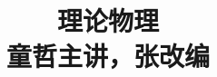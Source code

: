\documentclass[envcountsame,envcountchap]{svmono}
\begin{document}
	
	\title{理论物理\\
	\small{童哲主讲，张改编}}
	\maketitle
	
	\frontmatter%
	
	
	
	
	\tableofcontents
	
	
	\mainmatter%

	
	
	
	
	
	
	
	
	\backmatter%

	
	\printindex
	
	
\end{document}
